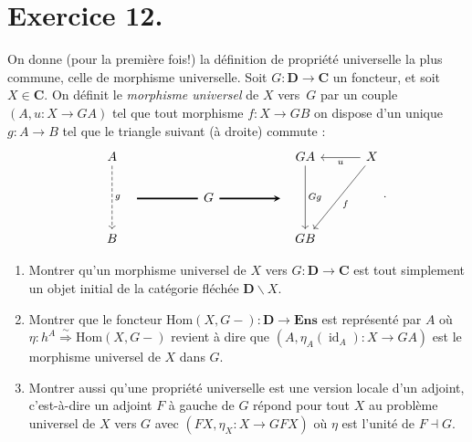 \documentclass{../../td}
\newcommand\id{\ensuremath{\operatorname{id}}}
\begin{document}
  \chapter{Exercice 12.}

  \begin{slshape}
    \color{deepblue}
    On donne (pour la première fois!) la définition de propriété universelle la plus commune, celle de morphisme universelle.
    Soit $G : \mathbf{D} \to \mathbf{C}$ un foncteur, et soit $X \in \mathbf{C}$.
    On définit le \textit{morphisme universel} de $X$ vers~$G$ par un couple $(A, u : X \to GA)$ tel que tout morphisme $f : X \to G B$ on dispose d'un unique $g : A \to B$ tel que le triangle suivant  (à droite) commute :
  \[
  \begin{tikzcd}
    A \arrow[dashed]{dd}{g} &&&& G A \arrow{dd}{G g} & X \arrow{l}{u} \arrow{ddl}{f} \\
    \quad\quad\quad\arrow[-,very thick]{rr}{} && G \arrow[-stealth,very thick]{rr}{} && \quad\quad\quad \\
    B &&&& GB
  \end{tikzcd}
  .\]
  \begin{enumerate}
    \item Montrer qu'un morphisme universel de $X$ vers $G : \mathbf{D} \to \mathbf{C}$ est tout simplement un objet initial de la catégorie fléchée $\mathbf{D} \backslash X$.
    \item Montrer que le foncteur $\mathrm{Hom}(X, G -) : \mathbf{D} \to \mathbf{Ens}$ est représenté par $A$ où $\eta : h^A \overset \sim \Rightarrow \mathrm{Hom}(X, G-)$ revient à dire que $(A, \eta_A(\id_A) : X \to G A)$ est le morphisme universel de $X$ dans $G$.
    \item Montrer aussi qu'une propriété universelle est une version locale d'un adjoint, c'est-à-dire un adjoint $F$ à gauche de $G$ répond pour tout $X$ au problème universel de $X$ vers $G$ avec $(F X, \eta_X : X \to GFX)$ où $\eta$ est l'unité de  $F \dashv G$.
  \end{enumerate}
  \end{slshape}
\end{document}
